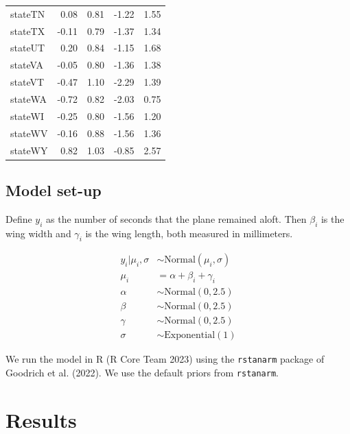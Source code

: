 \documentclass[
  letterpaper,
  DIV=11,
  numbers=noendperiod]{scrartcl}
\begin{document}
\begin{longtable}[t]{lrrrr}
stateTN & 0.08 & 0.81 & -1.22 & 1.55\\
stateTX & -0.11 & 0.79 & -1.37 & 1.34\\
\addlinespace
stateUT & 0.20 & 0.84 & -1.15 & 1.68\\
stateVA & -0.05 & 0.80 & -1.36 & 1.38\\
stateVT & -0.47 & 1.10 & -2.29 & 1.39\\
stateWA & -0.72 & 0.82 & -2.03 & 0.75\\
stateWI & -0.25 & 0.80 & -1.56 & 1.20\\
\addlinespace
stateWV & -0.16 & 0.88 & -1.56 & 1.36\\
stateWY & 0.82 & 1.03 & -0.85 & 2.57\\
\bottomrule
\end{longtable}

\hypertarget{model-set-up}{%
\subsection{Model set-up}\label{model-set-up}}

Define \(y_i\) as the number of seconds that the plane remained aloft.
Then \(\beta_i\) is the wing width and \(\gamma_i\) is the wing length,
both measured in millimeters.

\begin{align} 
y_i|\mu_i, \sigma &\sim \mbox{Normal}(\mu_i, \sigma) \\
\mu_i &= \alpha + \beta_i + \gamma_i\\
\alpha &\sim \mbox{Normal}(0, 2.5) \\
\beta &\sim \mbox{Normal}(0, 2.5) \\
\gamma &\sim \mbox{Normal}(0, 2.5) \\
\sigma &\sim \mbox{Exponential}(1)
\end{align}

We run the model in R (R Core Team 2023) using the \texttt{rstanarm}
package of Goodrich et al. (2022). We use the default priors from
\texttt{rstanarm}.

\hypertarget{results}{%
\section{Results}\label{results}}

\begin{table}

\end{table}
\end{document}
